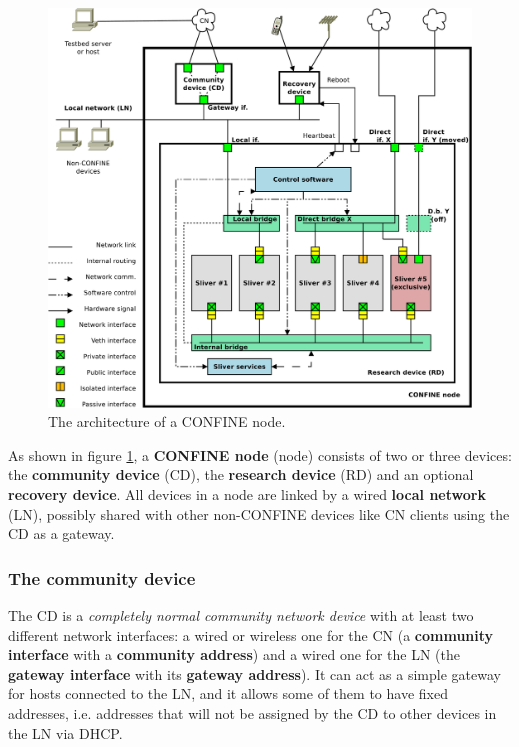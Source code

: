 \documentclass[conference]{IEEEtran}
\begin{document}
\begin{figure}[!t]
\centering
\includegraphics[width=\linewidth]{node-arch}
\caption{The architecture of a CONFINE node.}
\label{fig:node-arch}
\end{figure}

As shown in figure \ref{fig:node-arch}, a \textbf{CONFINE node} (node)
consists of two or three devices: the \textbf{community device} (CD), the
\textbf{research device} (RD) and an optional \textbf{recovery device}.  All
devices in a node are linked by a wired \textbf{local network} (LN), possibly
shared with other non-CONFINE devices like CN clients using the CD as a
gateway.

\subsubsection{The community device}

The CD is a \emph{completely normal community network device} with at least
two different network interfaces: a wired or wireless one for the CN (a
\textbf{community interface} with a \textbf{community address}) and a wired
one for the LN (the \textbf{gateway interface} with its \textbf{gateway
  address}).  It can act as a simple gateway for hosts connected to the LN,
and it allows some of them to have fixed addresses, i.e. addresses that will
not be assigned by the CD to other devices in the LN via DHCP.
\end{document}
